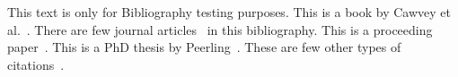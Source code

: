 

This text is only for Bibliography testing purposes. This is a book by Cawvey et al.~\cite{Cawvey2017}. There are few journal articles~\cite{Pakzad2018, Adachi2007} in this bibliography. This is a proceeding paper~\cite{J.Fenwick2010}. This is a PhD thesis by Peerling~\cite{PeerlingPhD1999}. These are few other types of citations~\cite{Panis2004}.